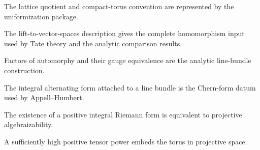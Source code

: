 \begin{remark}
\label{ch01-sec01-lattice-torus}
The lattice quotient and compact-torus convention are represented by the
uniformization package.
\notready
\end{remark}

\begin{remark}
\label{ch01-sec01-morphisms}
The lift-to-vector-spaces description gives the complete homomorphism input
used by Tate theory and the analytic comparison results.
\notready
\end{remark}

\begin{remark}
\label{ch01-sec02-factors}
Factors of automorphy and their gauge equivalence are the analytic line-bundle
construction.
\notready
\end{remark}

\begin{remark}
\label{ch01-sec02-riemann-form}
The integral alternating form attached to a line bundle is the Chern-form datum
used by Appell--Humbert.
\notready
\end{remark}

\begin{remark}
\label{ch01-sec03-algebraizability-criterion}
The existence of a positive integral Riemann form is equivalent to projective
algebraizability.
\notready
\end{remark}

\begin{remark}
\label{ch01-sec03-projective-realization}
A sufficiently high positive tensor power embeds the torus in projective space.
\notready
\end{remark}
